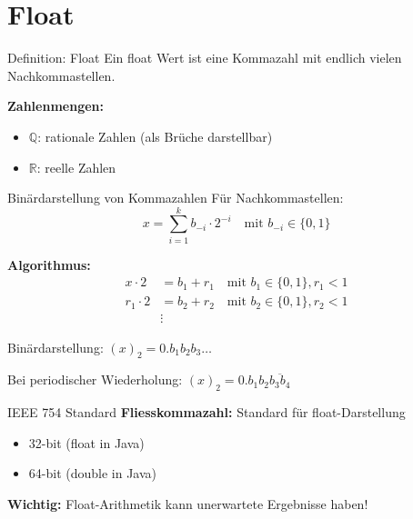\documentclass[a4paper, fontsize=7pt]{scrartcl}
\def\Q{\mathbb{Q}}  %
\def\R{\mathbb{R}}  %
\begin{document}
\section{Float}

\begin{mainbox}{Definition: Float}
Ein float Wert ist eine Kommazahl mit endlich vielen Nachkommastellen.

\textbf{Zahlenmengen:}
\begin{itemize}
    \item $\Q$: rationale Zahlen (als Brüche darstellbar)
    \item $\R$: reelle Zahlen
\end{itemize}
\end{mainbox}

\begin{mainbox}{Binärdarstellung von Kommazahlen}
Für Nachkommastellen:
$$x = \sum_{i=1}^{k} b_{-i} \cdot 2^{-i} \quad \text{mit } b_{-i} \in \{0,1\}$$

\textbf{Algorithmus:}
\begin{align*}
x \cdot 2 &= b_1 + r_1 \quad \text{mit } b_1 \in \{0,1\}, r_1 < 1 \\
r_1 \cdot 2 &= b_2 + r_2 \quad \text{mit } b_2 \in \{0,1\}, r_2 < 1 \\
&\vdots
\end{align*}

Binärdarstellung: $(x)_2 = 0.b_1 b_2 b_3 \ldots$

Bei periodischer Wiederholung: $(x)_2 = 0.b_1 b_2 \overline{b_3 b_4}$
\end{mainbox}

\begin{subbox}{IEEE 754 Standard}
\textbf{Fliesskommazahl:} Standard für float-Darstellung
\begin{itemize}
    \item 32-bit (float in Java)
    \item 64-bit (double in Java)
\end{itemize}

\textbf{Wichtig:} Float-Arithmetik kann unerwartete Ergebnisse haben!
\end{subbox}

\end{document}
